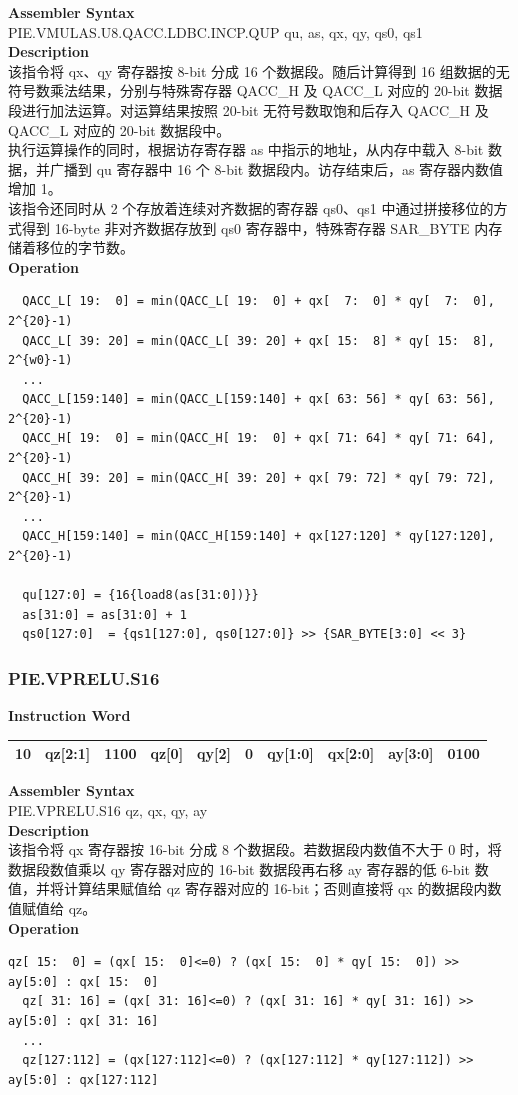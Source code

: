 \textbf{Assembler Syntax} \\
PIE.VMULAS.U8.QACC.LDBC.INCP.QUP qu, as, qx, qy, qs0, qs1 \\
\textbf{Description} \\
该指令将 qx、qy 寄存器按 8-bit 分成 16 个数据段。随后计算得到 16 组数据的无符号数乘法结果，分别与特殊寄存器 QACC\_H 及 QACC\_L 对应的 20-bit 数据段进行加法运算。对运算结果按照 20-bit 无符号数取饱和后存入 QACC\_H 及 QACC\_L 对应的 20-bit 数据段中。\\
执行运算操作的同时，根据访存寄存器 as 中指示的地址，从内存中载入 8-bit 数据，并广播到 qu 寄存器中 16 个 8-bit 数据段内。访存结束后，as 寄存器内数值增加 1。\\
该指令还同时从 2 个存放着连续对齐数据的寄存器 qs0、qs1 中通过拼接移位的方式得到 16-byte 非对齐数据存放到 qs0 寄存器中，特殊寄存器 SAR\_BYTE 内存储着移位的字节数。\\
\textbf{Operation}
\begin{lstlisting}
  QACC_L[ 19:  0] = min(QACC_L[ 19:  0] + qx[  7:  0] * qy[  7:  0], 2^{20}-1)
  QACC_L[ 39: 20] = min(QACC_L[ 39: 20] + qx[ 15:  8] * qy[ 15:  8], 2^{w0}-1)
  ...
  QACC_L[159:140] = min(QACC_L[159:140] + qx[ 63: 56] * qy[ 63: 56], 2^{20}-1)
  QACC_H[ 19:  0] = min(QACC_H[ 19:  0] + qx[ 71: 64] * qy[ 71: 64], 2^{20}-1)
  QACC_H[ 39: 20] = min(QACC_H[ 39: 20] + qx[ 79: 72] * qy[ 79: 72], 2^{20}-1)
  ...
  QACC_H[159:140] = min(QACC_H[159:140] + qx[127:120] * qy[127:120], 2^{20}-1)

  qu[127:0] = {16{load8(as[31:0])}}
  as[31:0] = as[31:0] + 1
  qs0[127:0]  = {qs1[127:0], qs0[127:0]} >> {SAR_BYTE[3:0] << 3}
\end{lstlisting}

\newpage
\subsubsection{PIE.VPRELU.S16}\label{instruction:PIEVPRELUS16}
\setlength\tabcolsep{6pt}
\textbf{Instruction Word} \\
\begin{tabular}{|c|c|c|c|c|c|c|c|c|c|}
	\hline
	10 & qz[2:1] & 1100 & qz[0] & qy[2] & 0 & qy[1:0] & qx[2:0] & ay[3:0] & 0100 \\
	\hline
\end{tabular}

\textbf{Assembler Syntax} \\
PIE.VPRELU.S16 qz, qx, qy, ay \\
\textbf{Description} \\
该指令将 qx 寄存器按 16-bit 分成 8 个数据段。若数据段内数值不大于 0 时，将数据段数值乘以 qy 寄存器对应的 16-bit 数据段再右移 ay 寄存器的低 6-bit 数值，并将计算结果赋值给 qz 寄存器对应的 16-bit；否则直接将 qx 的数据段内数值赋值给 qz。\\
\textbf{Operation}
\begin{lstlisting}[escapeinside=`?]
  qz[ 15:  0] = (qx[ 15:  0]<=0) ? (qx[ 15:  0] * qy[ 15:  0]) >> ay[5:0] : qx[ 15:  0]
  qz[ 31: 16] = (qx[ 31: 16]<=0) ? (qx[ 31: 16] * qy[ 31: 16]) >> ay[5:0] : qx[ 31: 16]
  ...
  qz[127:112] = (qx[127:112]<=0) ? (qx[127:112] * qy[127:112]) >> ay[5:0] : qx[127:112]
\end{lstlisting}

